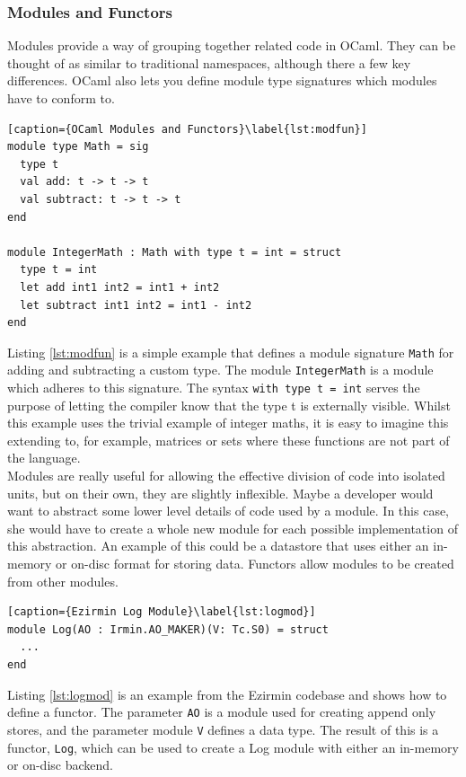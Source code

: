 \documentclass[12pt,a4paper,twoside,openright]{report}
\begin{document}
	\subsubsection*{Modules and Functors}
	Modules provide a way of grouping together related code in OCaml.
	They can be thought of as similar to traditional namespaces, although there a few key differences.
	OCaml also lets you define module type signatures which modules have to conform to.
	\begin{lstlisting}[caption={OCaml Modules and Functors}\label{lst:modfun}]
module type Math = sig
  type t
  val add: t -> t -> t
  val subtract: t -> t -> t
end

module IntegerMath : Math with type t = int = struct 
  type t = int
  let add int1 int2 = int1 + int2
  let subtract int1 int2 = int1 - int2
end
	\end{lstlisting}
	Listing \ref{lst:modfun} is a simple example that defines a module signature \texttt{Math} for adding and subtracting a custom type.
	The module \texttt{IntegerMath} is a module which adheres to this signature. 
	The syntax \texttt{with type t = int} serves the purpose of letting the compiler know that the type t is externally visible.
	Whilst this example uses the trivial example of integer maths, it is easy to imagine this extending to, for example, matrices or sets where these functions are not part of the language.\\

	Modules are really useful for allowing the effective division of code into isolated units, but on their own, they are slightly inflexible. 
	Maybe a developer would want to abstract some lower level details of code used by a module.
	In this case, she would have to create a whole new module for each possible implementation of this abstraction.
	An example of this could be a datastore that uses either an in-memory or on-disc format for storing data.
	Functors allow modules to be created from other modules.
	\begin{lstlisting}[caption={Ezirmin Log Module}\label{lst:logmod}]
module Log(AO : Irmin.AO_MAKER)(V: Tc.S0) = struct
  ...
end
	\end{lstlisting}
	Listing \ref{lst:logmod} is an example from the Ezirmin codebase and shows how to define a functor.
	The parameter \texttt{AO} is a module used for creating append only stores, and the parameter module \texttt{V} defines a data type.
	The result of this is a functor, \texttt{Log}, which can be used to create a Log module with either an in-memory or on-disc backend.
\end{document}
